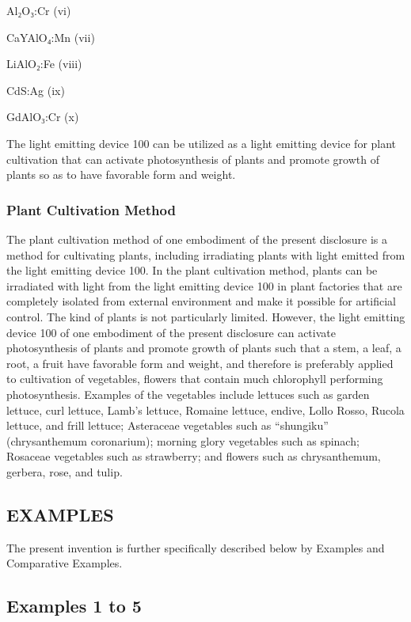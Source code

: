 \documentclass[11pt,a4paper]{article}
\begin{document}
Al₂O₃:Cr (vi)

CaYAlO₄:Mn (vii)

LiAlO₂:Fe (viii)

CdS:Ag (ix)

GdAlO₃:Cr (x)

The light emitting device 100 can be utilized as a light emitting device for plant cultivation that can activate photosynthesis of plants and promote growth of plants so as to have favorable form and weight.

\subsubsection{Plant Cultivation Method}

The plant cultivation method of one embodiment of the present disclosure is a method for cultivating plants, including irradiating plants with light emitted from the light emitting device 100. In the plant cultivation method, plants can be irradiated with light from the light emitting device 100 in plant factories that are completely isolated from external environment and make it possible for artificial control. The kind of plants is not particularly limited. However, the light emitting device 100 of one embodiment of the present disclosure can activate photosynthesis of plants and promote growth of plants such that a stem, a leaf, a root, a fruit have favorable form and weight, and therefore is preferably applied to cultivation of vegetables, flowers that contain much chlorophyll performing photosynthesis. Examples of the vegetables include lettuces such as garden lettuce, curl lettuce, Lamb's lettuce, Romaine lettuce, endive, Lollo Rosso, Rucola lettuce, and frill lettuce; Asteraceae vegetables such as “shungiku” (chrysanthemum coronarium); morning glory vegetables such as spinach; Rosaceae vegetables such as strawberry; and flowers such as chrysanthemum, gerbera, rose, and tulip.

\subsection{EXAMPLES}

The present invention is further specifically described below by Examples and Comparative Examples.

\subsection{Examples 1 to 5}
\end{document}
